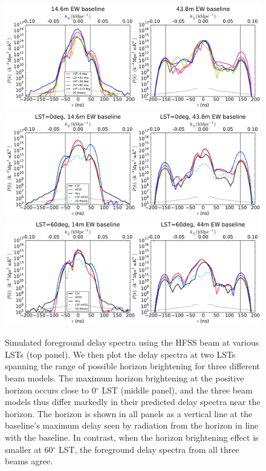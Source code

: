 \documentclass{emulateapj}
\begin{document}
\begin{figure}[h]
\centering
\includegraphics[width=6in]{nithya_fg_pspec_all_lst.pdf}
\includegraphics[width=6in]{nithya_fg_pspec_lst0deg.pdf}
\includegraphics[width=6in]{nithya_fg_pspec_lst60deg.pdf}
\caption{Simulated foreground delay spectra using the HFSS beam at various LSTs (top panel). We then plot the delay spectra at two LSTs spanning the range of possible horizon brightening for three different beam models. The maximum horizon brightening at the positive horizon occurs close to 0$^\circ$ LST (middle panel), and the three beam models thus differ markedly in their predicted delay spectra near the horizon. The horizon is shown in all panels as a vertical line at the baseline's maximum delay seen by radiation from the horizon in line with the baseline. In contrast, when the horizon brightening effect is smaller at 60$^\circ$ LST, the foreground delay spectra from all three beams agree.}
\label{fig:delayspec}
\end{figure}
\end{document}
